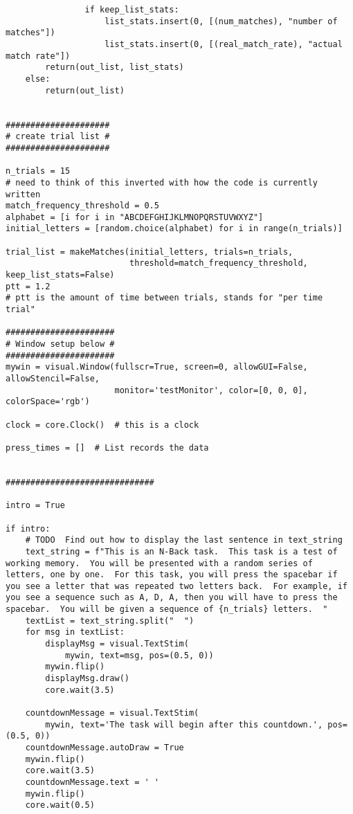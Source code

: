 \documentclass{article}
\begin{document}
\begin{verbatim}
                if keep_list_stats:
                    list_stats.insert(0, [(num_matches), "number of matches"])
                    list_stats.insert(0, [(real_match_rate), "actual match rate"])
        return(out_list, list_stats)
    else:
        return(out_list)


#####################
# create trial list #
#####################

n_trials = 15
# need to think of this inverted with how the code is currently written
match_frequency_threshold = 0.5
alphabet = [i for i in "ABCDEFGHIJKLMNOPQRSTUVWXYZ"]
initial_letters = [random.choice(alphabet) for i in range(n_trials)]

trial_list = makeMatches(initial_letters, trials=n_trials,
                         threshold=match_frequency_threshold, keep_list_stats=False)
ptt = 1.2
# ptt is the amount of time between trials, stands for "per time trial"

######################
# Window setup below #
######################
mywin = visual.Window(fullscr=True, screen=0, allowGUI=False, allowStencil=False,
                      monitor='testMonitor', color=[0, 0, 0], colorSpace='rgb')

clock = core.Clock()  # this is a clock

press_times = []  # List records the data


##############################

intro = True

if intro:
    # TODO  Find out how to display the last sentence in text_string
    text_string = f"This is an N-Back task.  This task is a test of working memory.  You will be presented with a random series of letters, one by one.  For this task, you will press the spacebar if you see a letter that was repeated two letters back.  For example, if you see a sequence such as A, D, A, then you will have to press the spacebar.  You will be given a sequence of {n_trials} letters.  "
    textList = text_string.split("  ")
    for msg in textList:
        displayMsg = visual.TextStim(
            mywin, text=msg, pos=(0.5, 0))
        mywin.flip()
        displayMsg.draw()
        core.wait(3.5)

    countdownMessage = visual.TextStim(
        mywin, text='The task will begin after this countdown.', pos=(0.5, 0))
    countdownMessage.autoDraw = True
    mywin.flip()
    core.wait(3.5)
    countdownMessage.text = ' '
    mywin.flip()
    core.wait(0.5)




\end{verbatim}
\end{document}
